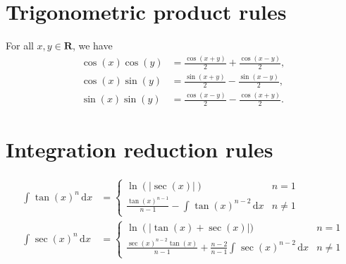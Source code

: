 \documentclass[letterpaper,landscape,9pt,fleqn]{extarticle}
\newcommand{\reals}{\mathbf{R}}
\newcommand{\dd}{\mathrm{d}}
\newcommand{\intl}[4]{\displaystyle\int^{#2}_{#1}{#3}{\,\dd #4}}
\begin{document}
\setlength{\parskip}{-6mm}
\begin{multicols*}{4}
\section*{Trigonometric product rules}

For all $x,y \in \reals$, we have 
\begin{align*}
\cos{\left( x\right) } \cos{\left( y \right) } & =\frac{\cos{\left( x + y \right) }}{2}+\frac{\cos{\left( x - y \right) }}{2},\\
\cos{\left( x \right) } \sin{\left( y \right) }&=\frac{\sin{\left( x + y \right) }}{2}-\frac{\sin{\left( x - y \right) }}{2}, \\
\sin{\left( x \right) } \sin{\left( y \right) } & =\frac{\cos{\left( x - y \right) }}{2}-\frac{\cos{\left( x + y\right) }}{2}.
\end{align*}

\vspace{0.1in}
\section*{Integration reduction rules}

\begin{align*}
 \intl{}{}{\tan(x)^n}{x} &= \begin{cases} \ln \left(|\sec(x)| \right) & n = 1 \\
                                \frac{\tan(x)^{n-1}} {n-1} - \intl{}{}{\tan(x)^{n-2}}{x} & n \neq 1
                                \end{cases}\\
   \intl{}{}{\sec(x)^n}{x} &= \begin{cases} \ln \left( |\tan(x)+\sec(x) \right |)  & n = 1 \\
                                \frac{\sec(x)^{n-2} \tan(x)} {n-1} + \frac{n-2}{n-1} \intl{}{}{\sec(x)^{n-2}}{x} & n \neq 1
                                \end{cases}
                     \end{align*}                   

\vspace{0.1in}                

\end{multicols*}
\end{document}
